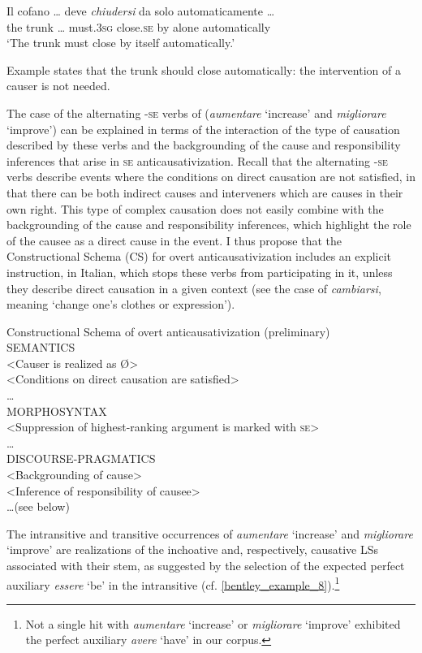 \documentclass[output=paper,colorlinks,citecolor=brown
]{langscibook}
\begin{document}
\ea \label{bentley_example_53}
\gll Il		cofano  {\ldots} 		deve					\textit{chiudersi} da		solo		automaticamente {\ldots } \\
	the	trunk	{\ldots}						must.3\textsc{sg}		close.\textsc{se}			by	alone	automatically \\
\glt ‘The trunk must close by itself automatically.’
\z

Example  states that the trunk should close automatically: the intervention of a causer is not needed. 

The case of the alternating -\textsc{se} verbs of  (\textit{aumentare} ‘increase’ and \textit{migliorare} ‘improve’) can be explained in terms of the interaction of the type of causation described by these verbs and the backgrounding of the cause and responsibility inferences that arise in \textsc{se} anticausativization. Recall that the alternating -\textsc{se} verbs describe events where the conditions on direct causation are not satisfied, in that there can be both indirect causes and interveners which are causes in their own right. This type of complex causation does not easily combine with the backgrounding of the cause and responsibility inferences, which highlight the role of the causee as a direct cause in the event. I thus propose that the Constructional Schema (CS) for overt anticausativization includes an explicit instruction, in Italian, which stops these verbs from participating in it, unless they describe direct causation in a given context (see the case of \textit{cambiarsi}, meaning ‘change one’s clothes or expression’).

\ea \label{bentley_example_54}
Constructional Schema of overt anticausativization (preliminary)\\
SEMANTICS\\
<Causer is realized as Ø>\\
<Conditions on direct causation are satisfied>\\
 \ldots \\
MORPHOSYNTAX\\
<Suppression of highest-ranking argument is marked with \textsc{se}>\\
 \ldots \\
DISCOURSE-PRAGMATICS\\
<Backgrounding of cause>\\
<Inference of responsibility of causee>\\
 \ldots  (see below)
\z

The intransitive and transitive occurrences of \textit{aumentare} ‘increase’ and \textit{migliorare} ‘improve’ are realizations of the inchoative and, respectively, causative LSs associated with their stem, as suggested by the selection of the expected perfect auxiliary \textit{essere} ‘be’ in the intransitive (cf. \ref{bentley_example_8}).\footnote{Not a single hit with \textit{aumentare} ‘increase’ or \textit{migliorare} ‘improve’ exhibited the perfect auxiliary \textit{avere} ‘have’ in our corpus.}
\end{document}

